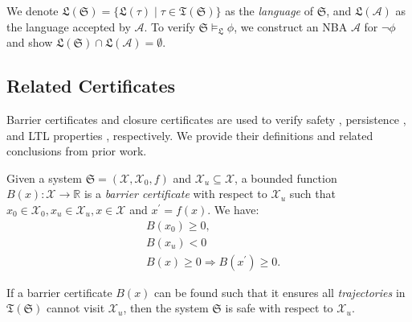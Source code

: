 We denote $\mathfrak{L}(\mathfrak{S}) = \{\mathfrak{L}(\tau) \mid \tau \in \mathfrak{T}(\mathfrak{S})\}$ as the \emph{language} of $\mathfrak{S}$, and $\mathfrak{L}(\mathcal{A})$ as the language accepted by $\mathcal{A}$. To verify $\mathfrak{S} \models_{\mathfrak{L}} \phi$, we construct an NBA $\mathcal{A}$ for $\neg \phi$ and show $\mathfrak{L}(\mathfrak{S}) \cap \mathfrak{L}(\mathcal{A}) = \emptyset$.

\subsection{Related Certificates}
Barrier certificates and closure certificates are used to verify safety \cite{prajna2004safety}, persistence \cite{murali2024closure}, and LTL properties \cite{murali2024closure}, respectively. We provide their definitions and related conclusions from prior work.

\begin{definition}
  \label{SCDEF}
  Given a system $\mathfrak{S} = (\mathcal{X}, \mathcal{X}_0, f)$ and $\mathcal{X}_{u} \subseteq \mathcal{X}$, a bounded function $B(x): \mathcal{X} \rightarrow \mathbb{R}$ is a \emph{barrier certificate} with respect to $\mathcal{X}_{u}$ such that $x_0 \in \mathcal{X}_0, x_u \in \mathcal{X}_u, x \in \mathcal{X}$ and $x^{\prime} = f(x)$. We have:
  \begin{align}
    &B(x_0) \geq 0, \label{bsinn0} \\ %
    &B(x_u) < 0 \label{bsun0} \\ %
    &B(x) \geq 0 \Rightarrow B(x^{\prime}) \geq 0. \label{bstnn0} %
  \end{align}
\end{definition}
\begin{theorem}[Safety]
  \label{corollary_tbsc}
  If a barrier certificate \( B(x) \) can be found such that it ensures all \emph{trajectories} in $\mathfrak{T}(\mathfrak{S})$ cannot visit $\mathcal{X}_{u}$, then the system $\mathfrak{S}$ is safe with respect to $\mathcal{X}_u$.
\end{theorem}

